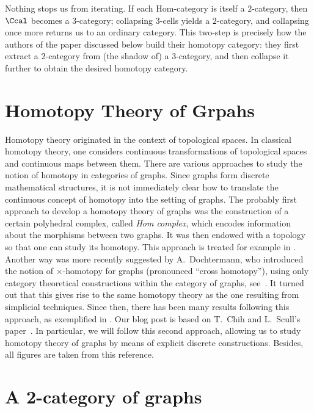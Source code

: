 \documentclass[11pt,a4paper]{article}
\begin{document}
Nothing stops us from iterating.  If each Hom-category is itself a $2$-category, then $\Ccal$ becomes a $3$-category; collapsing $3$-cells yields a $2$-category, and collapsing once more returns us to an ordinary category. This two-step  is precisely how the authors of the paper discussed below build their homotopy category: they first extract a $2$-category from (the shadow of) a $3$-category, and then collapse it further to obtain the desired homotopy category.

\newpage

\section{Homotopy Theory of Grpahs}

Homotopy theory originated in the context of topological spaces. In classical homotopy theory, one considers continuous transformations of topological spaces and continuous maps between them.
There are various approaches to study the notion of homotopy in categories of graphs. Since graphs form discrete mathematical structures, it is not immediately clear how to translate the continuous concept of homotopy into the setting of graphs. 
The probably first approach to develop a homotopy theory of graphs was the construction of a certain polyhedral complex, called \textit{Hom complex}, which encodes information about the morphisms between two graphs. It was then endowed with a topology so that one can study its homotopy. This approach is treated for example in \cite{Babson-et-al, Babson-Kozlov, Fieux-Lacaze, Kozlov_Chromatic, Kozlov_A-simple-proof, Kozlov_Collapsing, Kozlov_Simple-htpy}.
Another way was more recently suggested by A.~Dochtermann, who introduced the notion of $\times$-homotopy for graphs (pronounced ``cross homotopy''), using only category theoretical constructions within the category of graphs, see~\cite{Dochtermann_Hom-complexes}. It turned out that this gives rise to the same homotopy theory as the one resulting from simplicial techniques. Since then, there has been many results following this approach, as exemplified in \cite{Dochtermann_Homotopy, Chih-Scull, Droz, Goyal-Santhanam, Plessas}. 
Our blog post is based on T.~Chih and L.~Scull's paper~\cite{Chih-Scull}. In particular, we will follow this second approach, allowing us to study homotopy theory of graphs by means of explicit discrete constructions.
Besides, all figures are taken from this reference.

\section*{A 2-category of graphs}	
	
\end{document}
